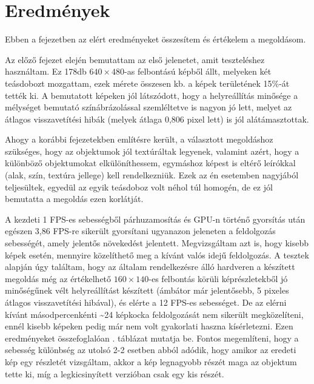\chapter{Eredmények}

Ebben a fejezetben az elért eredményeket összesítem és értékelem a megoldásom.

Az előző fejezet elején bemutattam az első jelenetet, amit teszteléshez használtam. Ez 178db $640\times 480$-as felbontású képből állt, melyeken két teásdobozt mozgattam, ezek mérete összesen kb. a képek területének 15\%-át tették ki. A bemutatott képeken jól látszódott, hogy a helyreállítás minősége a mélységet bemutató színábrázolással szemléltetve is nagyon jó lett, melyet az átlagos visszavetítési hibák (melyek átlaga 0,806 pixel lett) is jól alátámasztottak.

Ahogy a korábbi fejezetekben említésre került, a választott megoldáshoz szükséges, hogy az objektumok jól textúráltak legyenek, valamint azért, hogy a különböző objektumokat elkülöníthessem, egymáshoz képest is eltérő leírókkal (alak, szín, textúra jellege) kell rendelkezniük. Ezek az én esetemben nagyjából teljesültek, egyedül az egyik teásdoboz volt néhol túl homogén, de ez jól bemutatta a megoldás ezen korlátját.

A kezdeti 1 FPS-es sebességből párhuzamosítás és GPU-n történő gyorsítás után egészen 
3,86 FPS-re sikerült gyorsítani ugyanazon jeleneten a feldolgozás sebességét, amely jelentős növekedést jelentett. Megvizsgáltam azt is, hogy kisebb képek esetén, mennyire közelíthető meg a kívánt valós idejű feldolgozás. A tesztek alapján úgy találtam, hogy az általam rendelkezésre álló hardveren a készített megoldás még az értékelhető $160\times 140$-es felbontás körüli képrészletekből jó minőségűnek vélt helyreállítást készített (ámbátor már jelentősebb, 5 pixeles átlagos visszavetítési hibával), és elérte a 12 FPS-es sebességet. De az elérni kívánt másodpercenkénti \textasciitilde 24 képkocka feldolgozását nem sikerült megközelíteni, ennél kisebb képeken pedig már nem volt gyakorlati haszna kísérletezni. Ezen eredményeket összefoglalóan . táblázat mutatja be. Fontos megemlíteni, hogy a sebesség különbség az utolsó 2-2 esetben abból adódik, hogy amikor az eredeti kép egy részletét vizsgáltam, akkor a kép legnagyobb részét maga az objektum tette ki, míg a legkicsinyített verzióban csak egy kis részét.

